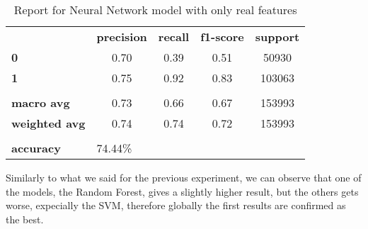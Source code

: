 \begin{table}[h!]
    \centering
    \begin{tabular}{lcccc}
        \rowcolor[HTML]{EEEEEE} 
        \cellcolor[HTML]{FBFBFB} & \textbf{precision} & \textbf{recall} & \textbf{f1-score} & \textbf{support} \\
        \rowcolor[HTML]{EEEEEE} 
        \textbf{0}               & 0.70               & 0.39            & 0.51              & 50930            \\
        \rowcolor[HTML]{EEEEEE} 
        \textbf{1}               & 0.75               & 0.92            & 0.83              & 103063           \\
        \rowcolor[HTML]{FBFBFB} 
        &                    &                 &                   &                  \\
        \rowcolor[HTML]{EEEEEE} 
        \textbf{macro avg}       & 0.73               & 0.66            & 0.67              & 153993           \\
        \rowcolor[HTML]{EEEEEE} 
        \textbf{weighted avg}    & 0.74               & 0.74            & 0.72              & 153993           \\
        \rowcolor[HTML]{FBFBFB} 
        &                    &                 &                   &                  \\
        \rowcolor[HTML]{EEEEEE} 
        \textbf{accuracy}        & \multicolumn{4}{l}{\cellcolor[HTML]{EEEEEE}74.44\%}                         
    \end{tabular}
    \caption{Report for Neural Network model with only real features}
    \label{tab:nn-res-real}
\end{table}

Similarly to what we said for the previous experiment, we can observe that one of the models, the Random Forest, gives a slightly higher result, but the others gets worse, expecially the SVM, therefore globally the first results are confirmed as the best.
